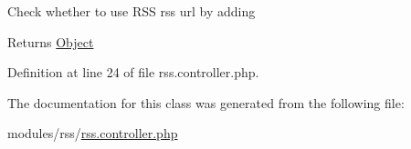 Check whether to use R\+SS rss url by adding

\begin{DoxyReturn}{Returns}
\hyperlink{classObject}{Object} 
\end{DoxyReturn}


Definition at line 24 of file rss.\+controller.\+php.



The documentation for this class was generated from the following file\+:\begin{DoxyCompactItemize}
\item 
modules/rss/\hyperlink{rss_8controller_8php}{rss.\+controller.\+php}\end{DoxyCompactItemize}
